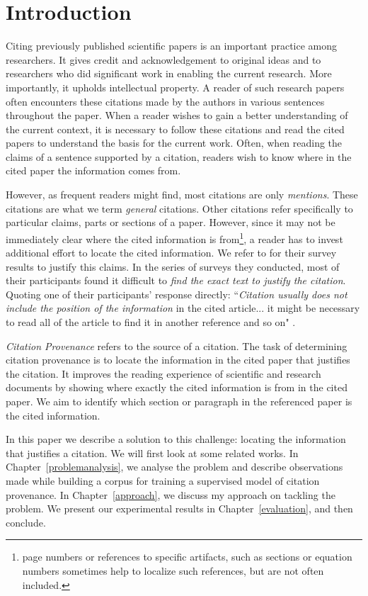 \chapter{Introduction}
\label{introduction}
Citing previously published scientific papers is an important practice among researchers. It gives credit and acknowledgement to original ideas and to researchers who did significant work in enabling the current research.  More importantly, it upholds intellectual property. A reader of such research papers often encounters these citations made by the authors in various sentences throughout the paper. When a reader wishes to gain a better understanding of the current context, it is necessary to follow these citations and read the cited papers to understand the basis for the current work.  Often, when reading the claims of a sentence supported by a citation, readers wish to know where in the cited paper the information comes from.  

However, as frequent readers might find, most citations are only \textit{mentions}. These citations are what we term \textit{general} citations. Other citations refer specifically to particular claims, parts or sections of a paper. However, since it may not be immediately clear where the cited information is from\footnote{page numbers or references to specific artifacts, such as sections or equation numbers sometimes help to localize such references, but are not often included.}, a reader has to invest additional effort to locate the cited information. We refer to \cite{citation-sensitive} for their survey results to justify this claims. In the series of surveys they conducted, most of their participants found it difficult to \textit{find the exact text to justify the citation}. Quoting one of their participants' response directly: ``\textit{Citation usually does not include the position of the information} in the cited article... it might be necessary to read all of the article to find it in another reference and so on" \cite{citation-sensitive}.

\textit{Citation Provenance} refers to the source of a citation. The task of determining citation provenance is to locate the information in the cited paper that justifies the citation. It improves the reading experience of scientific and research documents by showing where exactly the cited information is from in the cited paper. We aim to identify which section or paragraph in the referenced paper is the cited information. 

In this paper we describe a solution to this challenge: locating the information that justifies a citation. 
We will first look at some related works. In Chapter~\ref{problemanalysis}, we analyse the problem and describe observations made while building a corpus for training a supervised model of citation provenance. In Chapter~\ref{approach}, we discuss my approach on tackling the problem. We present our experimental results in Chapter~\ref{evaluation}, and then conclude.